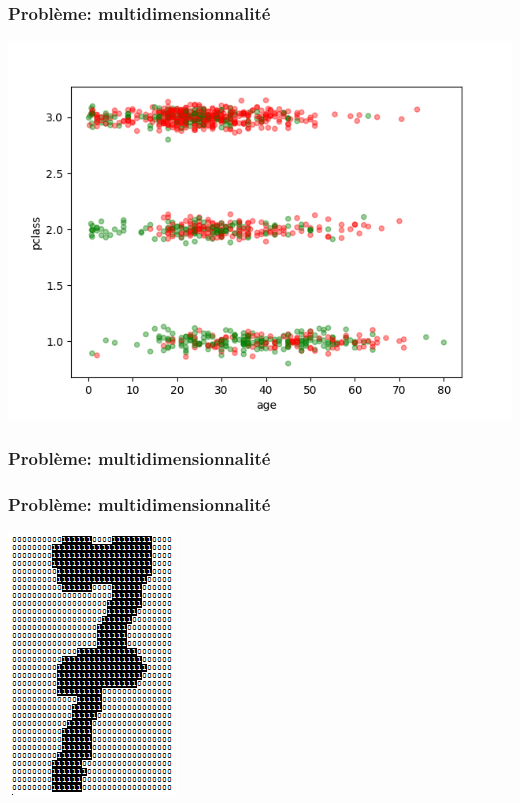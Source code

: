 \documentclass[11pt]{beamer}
\newenvironment{slide}[1]{%
\begin{frame}[environment=slide]
\frametitle{#1}
}{%
\end{frame}
}
\begin{document}
\begin{slide}{Problème: multidimensionnalité}
\begin{center}
\includegraphics[scale=0.4]{titanic_plot}
\end{center}
\end{slide}

\begin{slide}{Problème: multidimensionnalité}
\begin{center}
{\tiny }
\end{center}
\end{slide}

\begin{slide}{Problème: multidimensionnalité}
\begin{center}
\includegraphics[scale=.75]{optdigits-7}
\end{center}
\end{slide}
\end{document}
